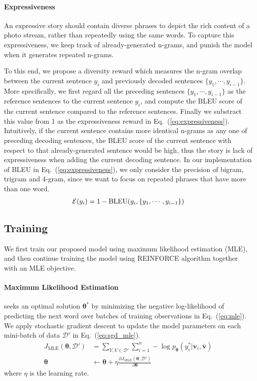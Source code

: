 \documentclass[letterpaper]{article} \usepackage{aaai20}  \usepackage{times}  \usepackage{helvet} \usepackage{courier}  \usepackage[hyphens]{url}  \usepackage{graphicx} \urlstyle{rm} \def\UrlFont{\rm}  \usepackage{graphicx}  \frenchspacing  \setlength{\pdfpagewidth}{8.5in}  \setlength{\pdfpageheight}{11in}  \usepackage{times}
\newcommand{\vb}{\mathbf{v}}
\newcommand{\Dcal}{\mathcal{D}}
\newcommand*{\thetab}{\bm{\theta}}
\begin{document}
\paragraph{Expressiveness}
An expressive story should contain diverse phrases to depict the rich content of a photo stream, rather than repeatedly using the same words. To capture this expressiveness, we keep track of already-generated n-grams, and punish the model when it generates repeated n-grams. 

To this end, we propose a diversity reward which measures the n-gram overlap between the current sentence $y_{i}$ and previously decoded sentences $\{y_1,\cdots, y_{i-1}\}$. More specifically, we first regard all the preceding sentences $\{y_1,\cdots, y_{i-1}\}$ as the reference sentences to the current sentence $y_{i}$, and compute the BLEU score of the current sentence compared to the reference sentences. Finally we substract this value from 1 as the expressiveness reward in Eq.~(\ref{eq:expressiveness}). Intuitively, if the current sentence contains more identical n-grams as any one of preceding decoding sentences, the BLEU score of the current sentence with respect to that already-generated sentence would be high, thus the story is lack of expressiveness when adding the current decoding sentence. In our implementation of BLEU in Eq.~(\ref{eq:expressiveness}), we only consider the precision of bigram, trigram and 4-gram, since we want to focus on repeated phrases that have more than one word. 
\begin{align} \label{eq:expressiveness}
    \mathcal{E}(y_i) = 1 - \text{BLEU}(y_{i},\{y_1,\cdots, y_{i-1}\}) 
\end{align}

\subsection{Training}
\label{sec:train}
We first train our proposed model using maximum likelihood estimation (MLE), and then continue training the model using REINFORCE algorithm together with an MLE objective.
\paragraph{Maximum Likelihood Estimation} seeks an optimal solution $\thetab^*$ by minimizing the negative log-likelihood of predicting the next word over batches of training observations in Eq.~(\ref{eq:mle}). We apply stochastic gradient descent to update the model parameters on each mini-batch of data $\Dcal'$ in Eq.~(\ref{eq:sgd_mle}).
\begin{align} \label{eq:mle}
    J_\text{MLE}(\thetab, \Dcal') &= \!\!\!\! \sum_{Y,V \in \Dcal'} \! \sum_{i=1}^n \! -\log p_{\thetab} (y_i^*|\vb_i,\bar{\vb}) \\ \label{eq:sgd_mle}
    \thetab & \leftarrow \thetab + \eta \frac{\partial J_\text{MLE}(\thetab, \Dcal') }{ \partial \thetab}
\end{align}
where $\eta$ is the learning rate.
\end{document}
